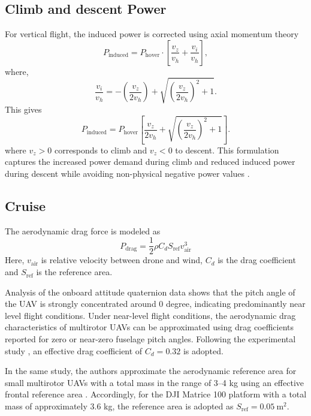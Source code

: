 \subsection{Climb and descent Power}
For vertical flight, the induced power is corrected using axial momentum theory
\begin{equation}
    P_\text{induced} = P_\text{hover} \cdot \left [  \frac{v_z}{v_h} + \frac{v_i}{v_h} \right ] ,
\end{equation}
where,
\begin{equation}
    \frac{v_i}{v_h} = - \left ( \frac{v_z}{2v_h} \right ) + \sqrt{ \left ( \frac{v_z}{2v_h} \right )^2 + 1 }.
\end{equation}
This gives
\begin{equation}
P_{\text{induced}} = P_\text{hover} \left [ \frac{v_z}{2v_h} +\sqrt{ \left ( \frac{v_z}{2v_h} \right )^2 + 1 } \right]    .
\end{equation}
where $v_z >0$ corresponds to climb and $v_z < 0$ to descent. This formulation captures the increased power demand during climb and reduced induced power during descent while avoiding non-physical negative power values \cite{lieshman2006, johnson1980}.

\subsection{Cruise}
The aerodynamic drag force is modeled as
\begin{equation}
P_{\text{drag}} = \frac{1}{2} \rho C_d S_{\text{ref}} v_{\text{air}}^3    
\end{equation}
Here, $v_{\text{air}}$ is relative velocity between drone and wind, $C_d$ is the drag coefficient and $S_{\text{ref}}$ is the reference area.

Analysis of the onboard attitude quaternion data shows that the pitch angle of the UAV is strongly concentrated around $0$ degree, indicating predominantly near level flight conditions. Under near-level flight conditions, the aerodynamic drag characteristics of multirotor UAVs can be approximated using drag coefficients reported for zero or near-zero fuselage pitch angles. Following the experimental study \cite{hammer2024}, an effective drag coefficient of $C_d = 0.32$ is adopted.

In the same study, the authors approximate the aerodynamic reference area for small multirotor UAVs with a total mass in the range of 3–4 kg using an effective frontal reference area \cite{hammer2024}. Accordingly, for the DJI Matrice 100 platform with a total mass of approximately 3.6 kg, the reference area is adopted as
$S_{\text{ref}} = 0.05 ~\text{m}^2$.

